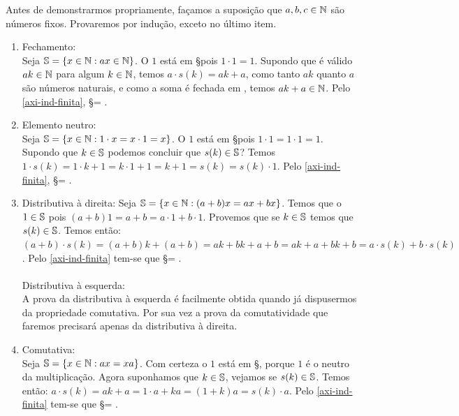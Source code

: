 \documentclass[../main.tex]{subfiles}
\begin{document}
\begin{dem}
    Antes de demonstrarmos propriamente, façamos a suposição que $a,b,c \in \N$ são números fixos. Provaremos por indução, exceto no último item.
    \begin{enumerate}[label=(\roman*)]
        \item Fechamento: \\
            Seja $\S = \{x \in \N : ax \in \N \}$.
            O $1$ está em \S pois $1 \cdot 1 = 1$. Supondo que é válido $ak \in \N$ para algum $k \in \N$, temos $a \cdot s(k) = ak + a$, como tanto $ak$ quanto $a$ são números naturais, e como a soma é fechada em \N, temos $ak + a \in \N$. Pelo \cref{axi-ind-finita}, \S = \N. 
        \item Elemento neutro: \\
            Seja $\S = \{ x \in \N : 1 \cdot x = x \cdot 1  = x \}$. O $1$ está em \S pois $1 \cdot 1 = 1 \cdot 1 = 1$. Supondo que $k \in \S$ podemos concluir que $s(k) \in \S$?
            Temos $1 \cdot s(k) = 1 \cdot k + 1 = k \cdot 1 + 1 = k + 1 = s(k) = s(k) \cdot 1$. Pelo \cref{axi-ind-finita}, \S = \N.
            
        \item Distributiva à direita: 
            Seja $\S = \{ x \in \N : ( a + b ) x = ax + bx \}$. Temos que o $1 \in \S$ pois $( a + b ) 1 = a + b = a \cdot 1 + b \cdot 1$. Provemos que se $k \in \S$ temos que $s(k) \in \S$. Temos então: \\
            $( a + b ) \cdot s(k)= ( a + b ) k + ( a + b ) = ak + bk + a + b = ak + a + bk + b 
            = a \cdot s(k) + b \cdot s(k)$. Pelo \cref{axi-ind-finita} tem-se que \S = \N.
            \\ \\
            Distributiva à esquerda: \\
            A prova da distributiva à esquerda é facilmente obtida quando já dispusermos da propriedade comutativa. Por sua vez a prova da comutatividade que faremos precisará apenas da distributiva à direita.
        \item Comutativa: \\
            Seja $\S = \{ x \in \N : ax = xa \}$. Com certeza o $1$ está em \S, porque $1$ é o neutro da multiplicação. Agora suponhamos que $k \in \S$, vejamos se $s(k) \in \S$. Temos então: $a \cdot s(k) = ak + a = 1 \cdot a + ka = (1+k)a = s(k) \cdot a$. Pelo \cref{axi-ind-finita} tem-se que \S = \N.


\end{enumerate}
\end{dem}
\end{document}
